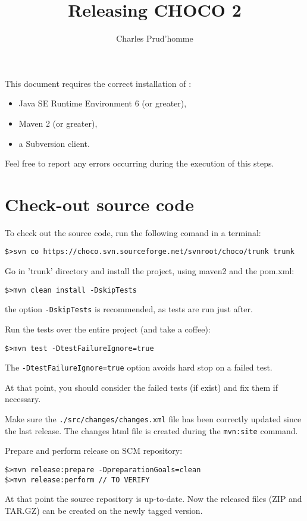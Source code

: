 \documentclass[11pt]{amsart}
\title{Releasing CHOCO 2}
\author{Charles Prud'homme}
\newcommand{\mylst}[1]{\lstinline|#1|}
\begin{document}
\maketitle

This document requires the correct installation of :
\begin{itemize}
\item Java SE Runtime Environment 6 (or greater),
\item Maven 2 (or greater),
\item a Subversion client.
\end{itemize}

Feel free to report any errors occurring during the execution of this steps.

\section{Check-out source code}

To check out the source code, run the following comand in a terminal:
\begin{lstlisting}
$>svn co https://choco.svn.sourceforge.net/svnroot/choco/trunk trunk
\end{lstlisting}

\vspace{.5cm}
Go in 'trunk' directory and install the project, using maven2 and the pom.xml:
\begin{lstlisting}
$>mvn clean install -DskipTests
\end{lstlisting}
the option \mylst{-DskipTests} is recommended, as tests are run just after. 

\vspace{.5cm}
Run the tests over the entire project (and take a coffee):
\begin{lstlisting}
$>mvn test -DtestFailureIgnore=true
\end{lstlisting}
The \mylst{-DtestFailureIgnore=true} option avoids hard stop on a failed test. 

At that point, you should consider the failed tests (if exist) and fix them if necessary. 

\vspace{.5cm}
Make sure the \mylst{./src/changes/changes.xml} file has been correctly updated since the last release. The changes html file is created during the \mylst{mvn:site} command. 

\vspace{.5cm}
Prepare and perform release on SCM repository:
\begin{lstlisting}
$>mvn release:prepare -DpreparationGoals=clean
$>mvn release:perform // TO VERIFY
\end{lstlisting}
At that point the source repository is up-to-date. Now the released files (ZIP and TAR.GZ) can be created on the newly tagged version.
\end{document}
